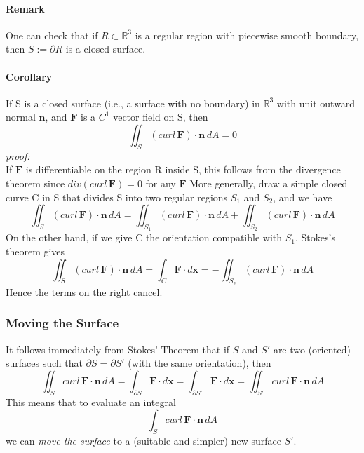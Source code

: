 \documentclass[11pt]{article}
\newcommand{\ti}[1]{\textit{#1}}
\newcommand{\tb}[1]{\textbf{#1}}
\newcommand{\real}[0]{\mathbb{R}}
\newcommand{\proof}[0]{\textit{\underline{proof:} }}
\newcommand{\vx}[0]{\tb{x}}
\newcommand{\vf}[0]{\tb{F}}
\newcommand{\vn}[0]{\tb{n}}
\newcommand{\p}[0]{\partial}
\begin{document}
\paragraph{Remark} One can check that if $R \subset \real^3$ is a regular region with piecewise smooth boundary, then $S:= \p R$ is a closed surface.

\paragraph{Corollary} If S is a closed surface (i.e., a surface with no boundary) in $\real^3$ with unit outward normal $\tb{n}$, and $\vf$ is a $C^1$ vector field on S, then $$\iint_S(curl \,\tb{F}) \cdot \tb{n} \, dA = 0$$
\proof \\ 
If $\vf$ is differentiable on the region R inside S, this follows from the divergence theorem since $div(curl \,\vf) = 0$ for any $\vf$
More generally, draw a simple closed curve C in S that divides S into two regular regions $S_1$ and $S_2$, and we have
$$\iint_S (curl \,\vf)\cdot \vn \,dA = \iint_{S_1}(curl\,\vf)\cdot\vn\,dA+\iint_{S_2}(curl\,\vf)\cdot \vn \, dA $$
On the other hand, if we give C the orientation compatible with $S_1$, Stokes's theorem gives
$$\iint_S (curl \,\vf)\cdot \vn \,dA = \int_C \vf \cdot d\vx = - \iint_{S_2}(curl \, \vf)\cdot \vn \,dA$$
Hence the terms on the right cancel.

\subsubsection{Moving the Surface}
It follows immediately from Stokes' Theorem that if $S$ and $S'$ are two (oriented) surfaces such that $\p S = \p S'$ (with the same orientation), then
$$\iint_S curl\, \vf \cdot \vn \, dA = \int_{\p S}\vf \cdot d\vx = \int_{\p S'}\vf\cdot d\vx = \iint_{S'} curl\, \vf \cdot \vn \, dA$$
This means that to evaluate an integral $$\int_S curl\,\vf\cdot \vn \, dA$$ we can \ti{move the surface} to a (suitable and simpler) new surface $S'$.
\end{document}
